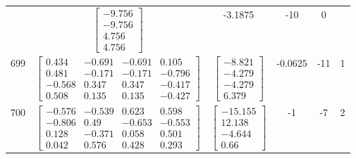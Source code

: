 \documentclass[a4paper,12pt]{article}
\begin{document}
\begin{tabular}{c c c c c c}
&
$\begin{bmatrix} -9.756 \\ -9.756 \\ 4.756 \\ 4.756 \end{bmatrix}$
&
-3.1875
&
-10
&
0
\\
699
&
$\begin{bmatrix} 0.434 & -0.691 & -0.691 & 0.105 \\ 0.481 & -0.171 & -0.171 & -0.796 \\ -0.568 & 0.347 & 0.347 & -0.417 \\ 0.508 & 0.135 & 0.135 & -0.427 \end{bmatrix}$
&
$\begin{bmatrix} -8.821 \\ -4.279 \\ -4.279 \\ 6.379 \end{bmatrix}$
&
-0.0625
&
-11
&
1
\\
700
&
$\begin{bmatrix} -0.576 & -0.539 & 0.623 & 0.598 \\ -0.806 & 0.49 & -0.653 & -0.553 \\ 0.128 & -0.371 & 0.058 & 0.501 \\ 0.042 & 0.576 & 0.428 & 0.293 \end{bmatrix}$
&
$\begin{bmatrix} -15.155 \\ 12.138 \\ -4.644 \\ 0.66 \end{bmatrix}$
&
-1
&
-7
&
2
\\
\end{tabular} \egroup \newpage
\end{document}
